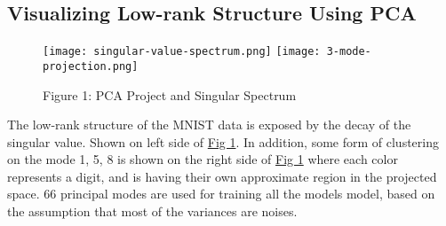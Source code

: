\documentclass{article}
\begin{document}
    \subsection{Visualizing Low-rank Structure Using PCA}
        \begin{figure}[h]
            \hspace{-4em}
            \texttt{[image: singular-value-spectrum.png]}
            \hspace{-2em}
            \texttt{[image: 3-mode-projection.png]}
            \caption{Figure 1: PCA Project and Singular Spectrum}
            \label{fig:fig1}
        \end{figure}
        \hspace{1.1em}
        The low-rank structure of the MNIST data is exposed by the decay of the singular value. Shown on left side of \hyperref[fig:fig1]{Fig 1}. In addition, some form of clustering on the mode 1, 5, 8 is shown on the right side of \hyperref[fig:fig1]{Fig 1} where each color represents a digit, and is having their own approximate region in the projected space. 66 principal modes are used for training all the models model, based on the assumption that most of the variances are noises. 
\end{document}
